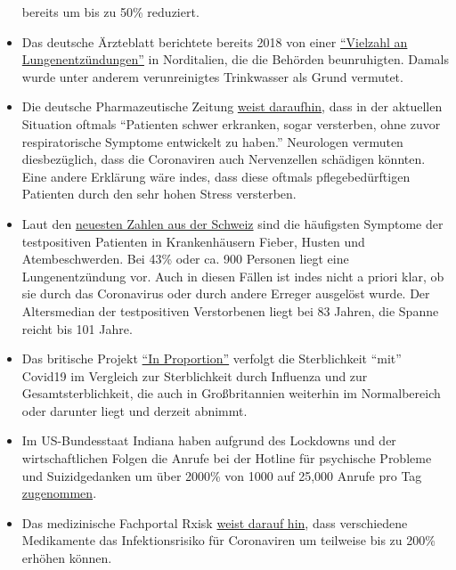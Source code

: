 \begin{itemize}
  bereits um bis zu 50\% reduziert.
\item
  Das deutsche Ärzteblatt berichtete bereits 2018 von einer
  \href{https://www.aerzteblatt.de/nachrichten/97750/Vielzahl-an-Lungenentzuendungen-beunruhigen-Behoerden-in-Norditalien}{``Vielzahl
  an Lungen­ent­zündungen''} in Norditalien, die die Behörden
  beunruhigten. Damals wurde unter anderem verunreinigtes Trinkwasser
  als Grund vermutet.
\item
  Die deutsche Pharmazeutische Zeitung
  \href{https://www.pharmazeutische-zeitung.de/atemstillstand-koennte-auch-zentrale-ursache-haben-116664/}{weist
  daraufhin}, dass in der aktuellen Situation oftmals ``Patienten schwer
  erkranken, sogar versterben, ohne zuvor respiratorische Symptome
  entwickelt zu haben.'' Neurologen vermuten diesbezüglich, dass die
  Coronaviren auch Nervenzellen schädigen könnten. Eine andere Erklärung
  wäre indes, dass diese oftmals pflegebedürftigen Patienten durch den
  sehr hohen Stress versterben.
\item
  Laut den
  \href{https://www.bag.admin.ch/dam/bag/de/dokumente/mt/k-und-i/aktuelle-ausbrueche-pandemien/2019-nCoV/covid-19-lagebericht.pdf.download.pdf/COVID-19_Epidemiologische_Lage_Schweiz.pdf}{neuesten
  Zahlen aus der Schweiz} sind die häufigsten Symptome der testpositiven
  Patienten in Krankenhäusern Fieber, Husten und Atembeschwerden. Bei
  43\% oder ca. 900 Personen liegt eine Lungenentzündung vor. Auch in
  diesen Fällen ist indes nicht a priori klar, ob sie durch das
  Coronavirus oder durch andere Erreger ausgelöst wurde. Der
  Altersmedian der testpositiven Verstorbenen liegt bei 83 Jahren, die
  Spanne reicht bis 101 Jahre.\\
\item
  Das britische Projekt \href{http://inproportion2.talkigy.com/}{``In
  Proportion''} verfolgt die Sterblichkeit ``mit'' Covid19 im Vergleich
  zur Sterblichkeit durch Influenza und zur Gesamtsterblichkeit, die
  auch in Großbritannien weiterhin im Normalbereich oder darunter liegt
  und derzeit abnimmt.
\item
  Im US-Bundesstaat Indiana haben aufgrund des Lockdowns und der
  wirtschaftlichen Folgen die Anrufe bei der Hotline für psychische
  Probleme und Suizidgedanken um über 2000\% von 1000 auf 25,000 Anrufe
  pro Tag
  \href{https://twitter.com/JesseKellyDC/status/1246449878219145216}{zugenommen}.
\item
  Das medizinische Fachportal Rxisk
  \href{https://rxisk.org/medications-compromising-covid-infections/}{weist
  darauf hin}, dass verschiedene Medikamente das Infektionsrisiko für
  Coronaviren um teilweise bis zu 200\% erhöhen können.
\end{itemize}

